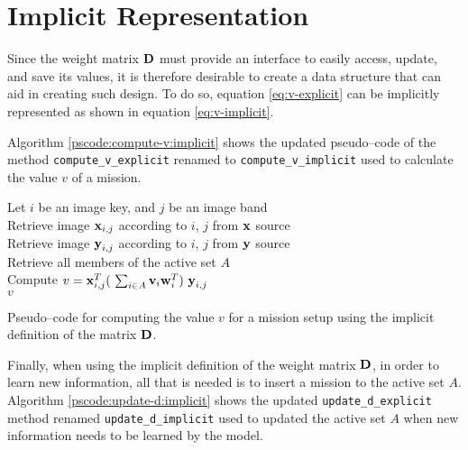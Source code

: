 \section{Implicit Representation} \label{sect:meth:implicit}

Since the weight matrix $\boldsymbol{\mathbf{D}}$ must provide an interface to easily access, update, and save its values, it is therefore desirable to create a data structure that can aid in creating such design. To do so, equation \ref{eq:v-explicit} can be implicitly represented as shown in equation \ref{eq:v-implicit}. \newline

Algorithm \ref{pscode:compute-v:implicit} shows the updated pseudo--code of the method \texttt{compute\_v\_explicit} renamed to \texttt{compute\_v\_implicit} used to calculate the value $v$ of a mission.

\vspace{0.4cm}
\begin{algorithm}[H]
    \SetAlgoLined
         {
            Let $i$ be an image key, and $j$ be an image band \\
            Retrieve image $\boldsymbol{\mathbf{x}}_{i,j}$ according to $i$, $j$ from $\boldsymbol{\mathbf{x}}$ source \\
            Retrieve image $\boldsymbol{\mathbf{y}}_{i,j}$ according to $i$, $j$ from $\boldsymbol{\mathbf{y}}$ source \\
            Retrieve all members of the active set $A$ \\
            Compute $v = \boldsymbol{\mathbf{x}}_{i,j}^T (\ \sum_{i \in A} \boldsymbol{\mathbf{v}}_i \boldsymbol{\mathbf{w}}_i^T )\ \boldsymbol{\mathbf{y}}_{i,j}$ \\
            \Return $v$
        }
    \caption{Pseudo--code for computing the value $v$ for a mission setup using the implicit definition of the matrix $\boldsymbol{\mathbf{D}}$.}
    \label{pscode:compute-v:implicit}
\end{algorithm}
\vspace{0.4cm}

Finally, when using the implicit definition of the weight matrix $\boldsymbol{\mathbf{D}}$, in order to learn new information, all that is needed is to insert a mission to the active set $A$. Algorithm \ref{pscode:update-d:implicit} shows the updated \texttt{update\_d\_explicit} method renamed \texttt{update\_d\_implicit} used to updated the active set $A$ when new information needs to be learned by the model.

